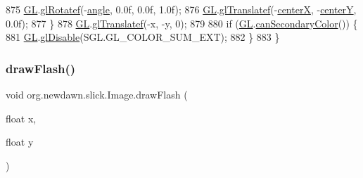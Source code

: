 \begin{DoxyCode}
875             \mbox{\hyperlink{classorg_1_1newdawn_1_1slick_1_1_image_aafbab31355bec79e747f477e970dcda4}{GL}}.\mbox{\hyperlink{interfaceorg_1_1newdawn_1_1slick_1_1opengl_1_1renderer_1_1_s_g_l_ac5675bd1b391998a8bf63d5d87a04347}{glRotatef}}(-\mbox{\hyperlink{classorg_1_1newdawn_1_1slick_1_1_image_a4076b08a44e95eba2b65075342f16070}{angle}}, 0.0f, 0.0f, 1.0f); 
876             \mbox{\hyperlink{classorg_1_1newdawn_1_1slick_1_1_image_aafbab31355bec79e747f477e970dcda4}{GL}}.\mbox{\hyperlink{interfaceorg_1_1newdawn_1_1slick_1_1opengl_1_1renderer_1_1_s_g_l_a647aff6cabd0c83869166144e9aee833}{glTranslatef}}(-\mbox{\hyperlink{classorg_1_1newdawn_1_1slick_1_1_image_aef548becf8450e7173bbd8bded5b6b48}{centerX}}, -\mbox{\hyperlink{classorg_1_1newdawn_1_1slick_1_1_image_a3935c6eead627c8aa8667985fc314496}{centerY}}, 0.0f); 
877         \}
878         \mbox{\hyperlink{classorg_1_1newdawn_1_1slick_1_1_image_aafbab31355bec79e747f477e970dcda4}{GL}}.\mbox{\hyperlink{interfaceorg_1_1newdawn_1_1slick_1_1opengl_1_1renderer_1_1_s_g_l_a647aff6cabd0c83869166144e9aee833}{glTranslatef}}(-x, -y, 0);
879         
880         \textcolor{keywordflow}{if} (\mbox{\hyperlink{classorg_1_1newdawn_1_1slick_1_1_image_aafbab31355bec79e747f477e970dcda4}{GL}}.\mbox{\hyperlink{interfaceorg_1_1newdawn_1_1slick_1_1opengl_1_1renderer_1_1_s_g_l_a0fc936b77fc280031741e79bd4a290b1}{canSecondaryColor}}()) \{
881             \mbox{\hyperlink{classorg_1_1newdawn_1_1slick_1_1_image_aafbab31355bec79e747f477e970dcda4}{GL}}.\mbox{\hyperlink{interfaceorg_1_1newdawn_1_1slick_1_1opengl_1_1renderer_1_1_s_g_l_a3b47b402f84bc1404e6b218264981bb5}{glDisable}}(SGL.GL\_COLOR\_SUM\_EXT);
882         \}
883     \}
\end{DoxyCode}
\mbox{\label{classorg_1_1newdawn_1_1slick_1_1_image_a3389eeb9c8b27b7a32dab2f51472475f}} 
\subsubsection{\texorpdfstring{draw\+Flash()}{drawFlash()}\hspace{0.1cm}{\footnotesize\ttfamily [3/3]}}
{\footnotesize\ttfamily void org.\+newdawn.\+slick.\+Image.\+draw\+Flash (\begin{DoxyParamCaption}\item[{float}]{x,  }\item[{float}]{y }\end{DoxyParamCaption})\hspace{0.3cm}{\ttfamily [inline]}}

